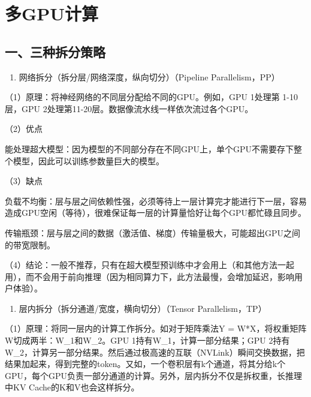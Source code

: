 \setcounter{section}{2}

\hypertarget{ux591agpuux8ba1ux7b97}{%
\section{多GPU计算}\label{ux591agpuux8ba1ux7b97}}

\hypertarget{ux4e00ux4e09ux79cdux62c6ux5206ux7b56ux7565}{%
\subsection{一、三种拆分策略}\label{ux4e00ux4e09ux79cdux62c6ux5206ux7b56ux7565}}

\begin{enumerate}
\def\labelenumi{\arabic{enumi}.}
\tightlist
\item
  网络拆分（拆分层/网络深度，纵向切分）（Pipeline Parallelism，PP）
\end{enumerate}

（1）原理：将神经网络的不同层分配给不同的GPU。例如，GPU 1处理第 1-10 层，GPU 2处理第11-20层。数据像流水线一样依次流过各个GPU。

（2）优点

能处理超大模型：因为模型的不同部分存在不同GPU上，单个GPU不需要存下整个模型，因此可以训练参数量巨大的模型。

（3）缺点

负载不均衡：层与层之间依赖性强，必须等待上一层计算完才能进行下一层，容易造成GPU空闲（等待），很难保证每一层的计算量恰好让每个GPU都忙碌且同步。

传输瓶颈：层与层之间的数据（激活值、梯度）传输量极大，可能超出GPU之间的带宽限制。

（4）结论：一般不推荐，只有在超大模型预训练中才会用上（和其他方法一起用），而不会用于前向推理（因为相同算力下，此方法最慢，会增加延迟，影响用户体验）。

\begin{enumerate}
\def\labelenumi{\arabic{enumi}.}
\setcounter{enumi}{1}
\tightlist
\item
  层内拆分（拆分通道/宽度，横向切分）（Tensor Parallelism，TP）
\end{enumerate}

（1）原理：将同一层内的计算工作拆分。如对于矩阵乘法Y = W*X，将权重矩阵W切成两半：W\_1和W\_2。GPU 1持有W\_1，计算一部分结果；GPU 2持有W\_2，计算另一部分结果。然后通过极高速的互联（NVLink）瞬间交换数据，把结果加起来，得到完整的token。又如，一个卷积层有k个通道，将其分给k个GPU，每个GPU负责一部分通道的计算。另外，层内拆分不仅是拆权重，长推理中KV Cache的K和V也会这样拆分。

